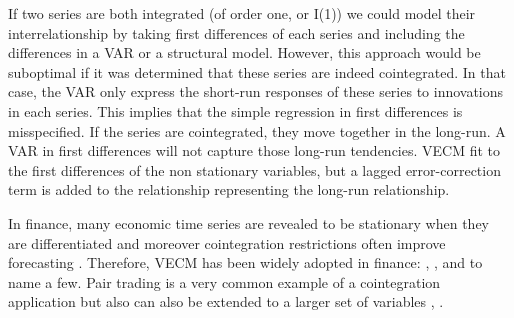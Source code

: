 If two series are both integrated (of order one, or I(1)) we could model
their interrelationship by taking first differences of each series and
including the differences in a VAR or a structural model.
However, this approach would be suboptimal if it was determined that
these series are indeed cointegrated. In that case, the VAR only
express the short-run responses of these series to innovations in each
series. This implies that the simple regression in first differences is
misspecified.
If the series are cointegrated, they move together in the long-run. A
VAR in first differences will not capture those long-run tendencies.
VECM fit to the first differences of the non stationary variables, but a lagged error-correction term is added to the relationship representing the long-run relationship.

In finance, many economic time series are revealed to be stationary when they
are differentiated and moreover cointegration restrictions often improve
forecasting \cite{duy1998}. Therefore, VECM has been widely adopted in
finance: \cite{mukherjee1995}, \cite{maysami2000}, \cite{arestis2001} and
\cite{seong2013} to name a few. Pair
trading is a very common example of a cointegration
application \cite{herlemont2003} but also can also be extended to a larger set
of variables \cite{mukherjee1995}, \cite{engle2004}.


